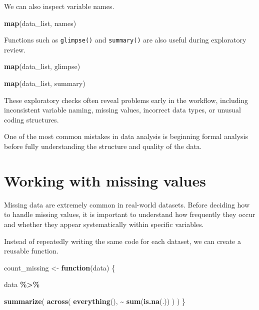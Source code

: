 \documentclass[
  11pt,
  oneside]{book}
\newenvironment{Shaded}{\begin{snugshade}}{\end{snugshade}}
\newcommand{\ControlFlowTok}[1]{\textcolor[rgb]{0.13,0.29,0.53}{\textbf{#1}}}
\newcommand{\FunctionTok}[1]{\textcolor[rgb]{0.13,0.29,0.53}{\textbf{#1}}}
\newcommand{\NormalTok}[1]{#1}
\newcommand{\OtherTok}[1]{\textcolor[rgb]{0.56,0.35,0.01}{#1}}
\newcommand{\SpecialCharTok}[1]{\textcolor[rgb]{0.81,0.36,0.00}{\textbf{#1}}}
\begin{document}
We can also inspect variable names.

\begin{Shaded}
\begin{Highlighting}[]
\FunctionTok{map}\NormalTok{(data\_list, names)}
\end{Highlighting}
\end{Shaded}

Functions such as \texttt{glimpse()} and \texttt{summary()} are also useful during exploratory review.

\begin{Shaded}
\begin{Highlighting}[]
\FunctionTok{map}\NormalTok{(data\_list, glimpse)}

\FunctionTok{map}\NormalTok{(data\_list, summary)}
\end{Highlighting}
\end{Shaded}

These exploratory checks often reveal problems early in the workflow, including inconsistent variable naming, missing values, incorrect data types, or unusual coding structures.

One of the most common mistakes in data analysis is beginning formal analysis before fully understanding the structure and quality of the data.

\section{Working with missing values}\label{working-with-missing-values}

Missing data are extremely common in real-world datasets. Before deciding how to handle missing values, it is important to understand how frequently they occur and whether they appear systematically within specific variables.

Instead of repeatedly writing the same code for each dataset, we can create a reusable function.

\begin{Shaded}
\begin{Highlighting}[]
\NormalTok{count\_missing }\OtherTok{\textless{}{-}} \ControlFlowTok{function}\NormalTok{(data) \{}
  
\NormalTok{  data }\SpecialCharTok{\%\textgreater{}\%}
    
    \FunctionTok{summarize}\NormalTok{(}
      \FunctionTok{across}\NormalTok{(}
        \FunctionTok{everything}\NormalTok{(),}
        \SpecialCharTok{\textasciitilde{}} \FunctionTok{sum}\NormalTok{(}\FunctionTok{is.na}\NormalTok{(.))}
\NormalTok{      )}
\NormalTok{    )}
\NormalTok{\}}
\end{Highlighting}
\end{Shaded}
\end{document}
